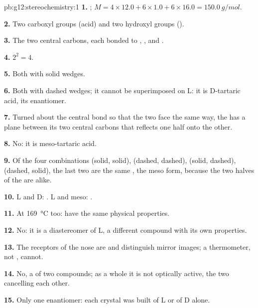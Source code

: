 \begin{solution}{pb:g12:stereochemistry:1}
\textbf{1.} ; $M = 4 \times 12.0 + 6 \times 1.0 + 6 \times 16.0
= \qty{150.0}{g/mol}$.

\textbf{2.} Two carboxyl groups (acid) and two hydroxyl groups
().

\textbf{3.} The two central carbons, each bonded to , ,
 and .

\textbf{4.} $2^2 = 4$.

\textbf{5.} Both with solid wedges.

\textbf{6.} Both  with dashed wedges; it cannot be superimposed on
L: it is D-tartaric acid, its enantiomer.

\textbf{7.} Turned about the central bond so that the two  face
the same way, the  has a plane between its two central carbons
that reflects one half onto the other.

\textbf{8.} No: it is meso-tartaric acid.

\textbf{9.} Of the four combinations (solid, solid), (dashed, dashed),
(solid, dashed), (dashed, solid), the last two are the same ,
the meso form, because the two halves of the  are alike.

\textbf{10.} L and D: . L and meso: .

\textbf{11.} At \qty{169}{\celsius} too:  have the same
physical properties.

\textbf{12.} No: it is a diastereomer of L, a different compound with
its own properties.

\textbf{13.} The receptors of the nose are  and distinguish
mirror images; a thermometer, not , cannot.

\textbf{14.} No, a  of two compounds; as a whole it is not
optically active, the two  cancelling each other.

\textbf{15.} Only one enantiomer: each crystal was built of L or of D
alone.


\end{solution}
